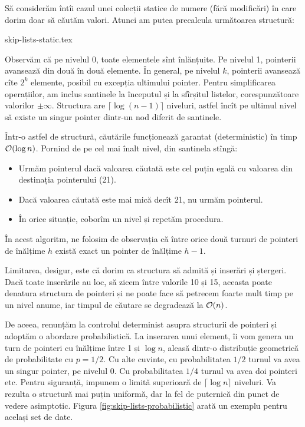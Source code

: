\documentclass[../main.tex]{subfiles}
\begin{document}
Să considerăm întîi cazul unei colecții statice de numere (fără modificări) în care dorim doar să căutăm valori. Atunci am putea precalcula următoarea structură:

{skip-lists-static.tex}

Observăm că pe nivelul 0, toate elementele sînt înlănțuite. Pe nivelul 1, pointerii avansează din două în două elemente. În general, pe nivelul $k$, pointerii avansează cîte $2^k$ elemente, posibil cu excepția ultimului pointer. Pentru simplificarea operațiilor, am inclus santinele la începutul și la sfîrșitul listelor, corespunzătoare valorilor $\pm \infty$. Structura are $\lceil \log (n - 1) \rceil$ niveluri, astfel încît pe ultimul nivel să existe un singur pointer dintr-un nod diferit de santinele.

Într-o astfel de structură, căutările funcționează garantat (deterministic) în timp $\mathcal{O}(\log n)$. Pornind de pe cel mai înalt nivel, din santinela stîngă:

\begin{itemize}
  \item Urmăm pointerul dacă valoarea căutată este cel puțin egală cu valoarea din destinația pointerului (21).
  \item Dacă valoarea căutată este mai mică decît 21, nu urmăm pointerul.
  \item În orice situație, coborîm un nivel și repetăm procedura.
\end{itemize}

În acest algoritm, ne folosim de observația că între orice două turnuri de pointeri de înălțime $h$ există exact un pointer de înălțime $h-1$.

Limitarea, desigur, este că dorim ca structura să admită și inserări și ștergeri. Dacă toate inserările au loc, să zicem între valorile 10 și 15, aceasta poate denatura structura de pointeri și ne poate face să petrecem foarte mult timp pe un nivel anume, iar timpul de căutare se degradează la $\mathcal{O}(n)$.

De aceea, renunțăm la controlul determinist asupra structurii de pointeri și adoptăm o abordare probabilistică. La inserarea unui element, îi vom genera un turn de pointeri cu înălțime între 1 și $\log n$, aleasă dintr-o distribuție geometrică de probabilitate cu $p=1/2$. Cu alte cuvinte, cu probabilitatea $1/2$ turnul va avea un singur pointer, pe nivelul 0. Cu probabilitatea $1/4$ turnul va avea doi pointeri etc. Pentru siguranță, impunem o limită superioară de $\lceil \log n \rceil$ niveluri. Va rezulta o structură mai puțin uniformă, dar la fel de puternică din punct de vedere asimptotic. Figura \ref{fig:skip-lists-probabilistic} arată un exemplu pentru același set de date.
\end{document}
